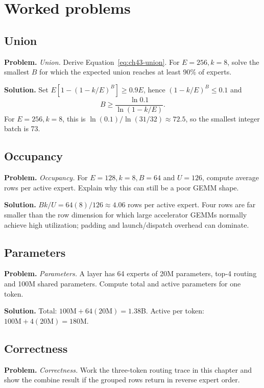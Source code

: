 \section{Worked problems}

\subsection{Union}
\textbf{Problem.} \emph{Union.} Derive Equation~\eqref{eq:ch43-union}. For $E=256,k=8$, solve the
smallest $B$ for which the expected union reaches at least 90\% of experts.

\textbf{Solution.} Set $E[1-(1-k/E)^B]\ge0.9E$, hence
$(1-k/E)^B\le0.1$ and
\[
B\ge\frac{\ln 0.1}{\ln(1-k/E)}.
\]
For $E=256,k=8$, this is $\ln(0.1)/\ln(31/32)\approx72.5$, so the smallest
integer batch is 73.

\subsection{Occupancy}
\textbf{Problem.} \emph{Occupancy.} For $E=128,k=8,B=64$ and $U=126$, compute average rows per
active expert. Explain why this can still be a poor GEMM shape.

\textbf{Solution.} $Bk/U=64(8)/126\approx4.06$ rows per active expert. Four rows are far smaller than
the row dimension for which large accelerator GEMMs normally achieve high utilization;
padding and launch/dispatch overhead can dominate.

\subsection{Parameters}
\textbf{Problem.} \emph{Parameters.} A layer has 64 experts of 20M parameters, top-4 routing and
100M shared parameters. Compute total and active parameters for one token.

\textbf{Solution.} Total: $100\text{M}+64(20\text{M})=1.38$B. Active per token:
$100\text{M}+4(20\text{M})=180$M.

\subsection{Correctness}
\textbf{Problem.} \emph{Correctness.} Work the three-token routing trace in this chapter and show
the combine result if the grouped rows return in reverse expert order.

